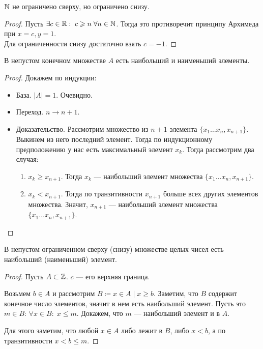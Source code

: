 \begin{example}
    $\mathbb{N}$ не ограничено сверху, но ограничено снизу.
\end{example}
\begin{proof}
    Пусть $\exists c \in \mathbb{R}: \; c \geqslant n\; \forall n \in \mathbb{N}$. Тогда это противоречит принципу Архимеда при $x = c, y = 1$. \\ Для ограниченности снизу достаточно взять $c=-1$.
\end{proof}
\begin{theorem}
    В непустом конечном множестве $A$ есть наибольший и наименьший элементы.
\end{theorem}
\begin{proof}
    Докажем по индукции:
    \begin{itemize}
        \item База. $|A| = 1$. Очевидно.
        \item Переход.  $n \to n + 1$.
        \item Доказательство. Рассмотрим множество из  $n + 1$ элемента  $\{x_1\ldots x_n,x_{n+1}\}$. Выкинем из него последний элемент. Тогда по индукционному предположению у нас есть максимальный элемент $x_k$. Тогда рассмотрим два случая:
             \begin{enumerate}
                 \item $x_k \ge x_{n+1}$. Тогда $x_k$ --- наибольший элемент множества $\{x_1\ldots x_n,x_{n+1}\}$.
                 \item $x_k < x_{n+1}$. Тогда по транзитивности  $x_{n+1}$ больше всех других элементов множества. Значит, $x_{n+1}$ --- наибольший элемент множества $\{x_1\ldots x_n,x_{n+1}\}$.
            \end{enumerate}
    \end{itemize}
\end{proof}
\begin{theorem}
    В непустом ограниченном сверху (снизу) множестве целых чисел есть наибольший (наименьший) элемент.
\end{theorem}
\begin{proof}
    Пусть $A \subset \mathbb{Z}$.  $c$ --- его верхняя граница. 

    Возьмем  $b \in A$ и рассмотрим  $B \coloneqq {x \in A \mid x \ge b}$. Заметим, что $B$ содержит конечное число элементов, значит в нем есть наибольший элемент. Пусть это $m \in B$:  $\forall x \in B:\; x \le m$. Докажем, что $m$ --- наибольший элемент и в  $A$. 

    Для этого заметим, что любой $x \in A$ либо лежит в $B$, либо  $x < b$, а по транзитивности  $x < b \le m$.
\end{proof}

